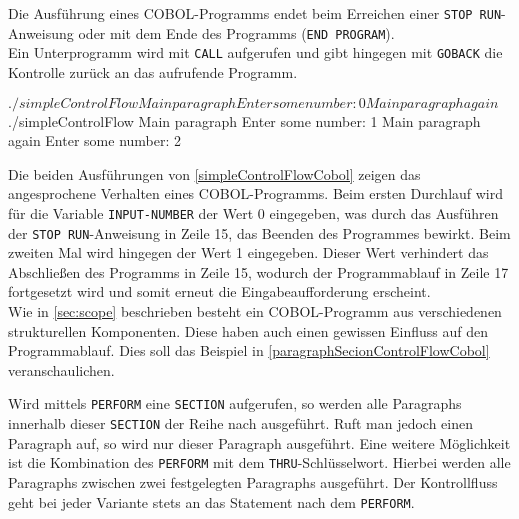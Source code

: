 Die Ausführung eines COBOL-Programms endet beim Erreichen einer \texttt{STOP RUN}-Anweisung oder mit dem Ende des Programms (\texttt{END PROGRAM}). \\

Ein Unterprogramm wird mit \texttt{CALL} aufgerufen und gibt hingegen mit \texttt{GOBACK} die Kontrolle zurück an das aufrufende Programm.\\

\sepCodeAndOutputCheck
\begin{shellwindow}
$ ./simpleControlFlow 
Main paragraph
Enter some number: 0
Main paragraph again
$ ./simpleControlFlow 
Main paragraph
Enter some number: 1 
Main paragraph again
Enter some number: 2
\end{shellwindow}

Die beiden Ausführungen von \autoref{simpleControlFlowCobol} zeigen das angesprochene Verhalten eines COBOL-Programms. Beim ersten Durchlauf wird für die Variable \texttt{INPUT-NUMBER} der Wert 0 eingegeben, was durch das Ausführen der \texttt{STOP RUN}-Anweisung in Zeile 15, das Beenden des Programmes bewirkt. Beim zweiten Mal wird hingegen der Wert 1 eingegeben. Dieser Wert verhindert das Abschließen des Programms in Zeile 15, wodurch der Programmablauf in Zeile 17 fortgesetzt wird und somit erneut die Eingabeaufforderung erscheint.\\

Wie in \autoref{sec:scope} beschrieben besteht ein COBOL-Programm aus verschiedenen strukturellen Komponenten. Diese haben auch einen gewissen Einfluss auf den Programmablauf. Dies soll das Beispiel in \autoref{paragraphSecionControlFlowCobol} veranschaulichen.\\

\sepCodeAndOutputCheck
{}

Wird mittels \texttt{PERFORM} eine \texttt{SECTION} aufgerufen, so werden alle Paragraphs innerhalb dieser \texttt{SECTION} der Reihe nach ausgeführt. Ruft man jedoch einen Paragraph auf, so wird nur dieser Paragraph ausgeführt. Eine weitere Möglichkeit ist die Kombination des \texttt{PERFORM} mit dem \texttt{THRU}-Schlüsselwort. Hierbei werden alle Paragraphs zwischen zwei festgelegten Paragraphs ausgeführt. Der Kontrollfluss geht bei jeder Variante stets an das Statement nach dem \texttt{PERFORM}.\\


